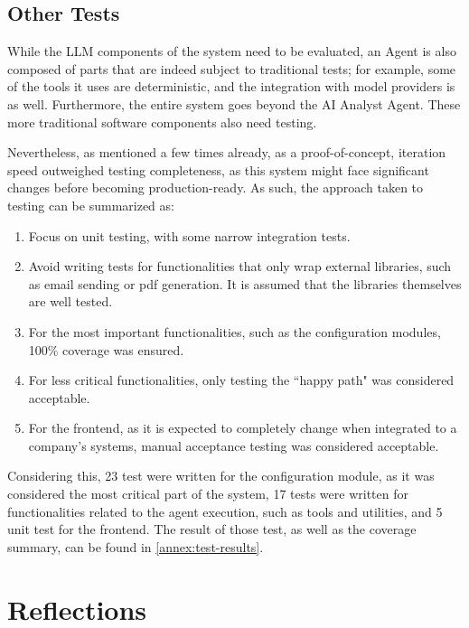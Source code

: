 \documentclass[a4paper]{report}
\begin{document}
\section{Other Tests}
\label{sec:other-tests}

While the LLM components of the system need to be evaluated, an Agent is also composed of parts that are indeed subject to traditional tests; for example, some of the tools it uses are deterministic, and the integration with model providers is as well. Furthermore, the entire system goes beyond the AI Analyst Agent. These more traditional software components also need testing.

Nevertheless, as mentioned a few times already, as a proof-of-concept, iteration speed outweighed testing completeness, as this system might face significant changes before becoming production-ready. As such, the approach taken to testing can be summarized as:

\begin{enumerate}
    \item Focus on unit testing, with some narrow integration tests.
    \item Avoid writing tests for functionalities that only wrap external libraries, such as email sending or pdf generation. It is assumed that the libraries themselves are well tested.
    \item For the most important functionalities, such as the configuration modules, 100\% coverage was ensured.
    \item For less critical functionalities, only testing the ``happy path" was considered acceptable.
    \item For the frontend, as it is expected to completely change when integrated to a company's systems, manual acceptance testing was considered acceptable.
\end{enumerate}

Considering this, 23 test were written for the configuration module, as it was considered the most critical part of the system, 17 tests were written for functionalities related to the agent execution, such as tools and utilities, and 5 unit test for the frontend. The result of those test, as well as the coverage summary, can be found in \autoref{annex:test-results}.

\chapter{Reflections}
\label{chapter:reflections}
\end{document}
